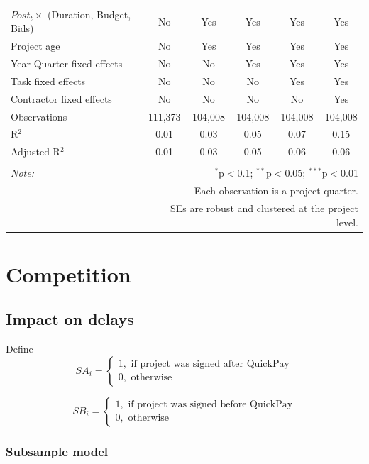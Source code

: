 \documentclass[]{article}
\begin{document}
\begin{table}[H]
\begin{tabular}{@{\extracolsep{-2pt}}lccccc}
$Post_t \times $  (Duration, Budget, Bids) & No & Yes & Yes & Yes & Yes \\ 
Project age & No & Yes & Yes & Yes & Yes \\ 
Year-Quarter fixed effects & No & No & Yes & Yes & Yes \\ 
Task fixed effects & No & No & No & Yes & Yes \\ 
Contractor fixed effects & No & No & No & No & Yes \\ 
Observations & 111,373 & 104,008 & 104,008 & 104,008 & 104,008 \\ 
R$^{2}$ & 0.01 & 0.03 & 0.05 & 0.07 & 0.15 \\ 
Adjusted R$^{2}$ & 0.01 & 0.03 & 0.05 & 0.06 & 0.06 \\ 
\hline 
\hline \\[-1.8ex] 
\textit{Note:}  & \multicolumn{5}{r}{$^{*}$p$<$0.1; $^{**}$p$<$0.05; $^{***}$p$<$0.01} \\ 
 & \multicolumn{5}{r}{Each observation is a project-quarter.} \\ 
 & \multicolumn{5}{r}{SEs are robust and clustered at the project level.} \\ 
\end{tabular} 
\end{table}

\hypertarget{competition}{%
\section{Competition}\label{competition}}

\hypertarget{impact-on-delays}{%
\subsection{Impact on delays}\label{impact-on-delays}}

Define
\[ SA_i = \begin{cases} 1, \text{ if project was signed after QuickPay}\\
0, \text{ otherwise} \end{cases}\]

\[ SB_i = \begin{cases} 1, \text{ if project was signed before QuickPay}\\
0, \text{ otherwise} \end{cases}\]

\hypertarget{subsample-model}{%
\subsubsection{Subsample model}\label{subsample-model}}
\end{document}
